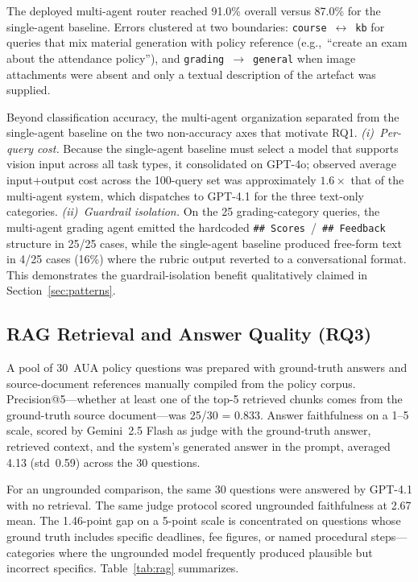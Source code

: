 \documentclass[conference]{IEEEtran}
\begin{document}
The deployed multi-agent router reached 91.0\% overall versus 87.0\% for the single-agent baseline. Errors clustered at two boundaries: \texttt{course}~$\leftrightarrow$~\texttt{kb} for queries that mix material generation with policy reference (e.g.,~``create an exam about the attendance policy''), and \texttt{grading}~$\to$~\texttt{general} when image attachments were absent and only a textual description of the artefact was supplied.

Beyond classification accuracy, the multi-agent organization separated from the single-agent baseline on the two non-accuracy axes that motivate RQ1. \emph{(i)~Per-query cost.} Because the single-agent baseline must select a model that supports vision input across all task types, it consolidated on GPT-4o; observed average input+output cost across the 100-query set was approximately $1.6\times$ that of the multi-agent system, which dispatches to GPT-4.1 for the three text-only categories. \emph{(ii)~Guardrail isolation.} On the 25 grading-category queries, the multi-agent grading agent emitted the hardcoded \texttt{\#\#~Scores}~/~\texttt{\#\#~Feedback} structure in 25/25 cases, while the single-agent baseline produced free-form text in 4/25 cases (16\%) where the rubric output reverted to a conversational format. This demonstrates the guardrail-isolation benefit qualitatively claimed in Section~\ref{sec:patterns}.

\subsection{RAG Retrieval and Answer Quality (RQ3)}

A pool of 30~AUA policy questions was prepared with ground-truth answers and source-document references manually compiled from the policy corpus. Precision@5---whether at least one of the top-5 retrieved chunks comes from the ground-truth source document---was 25/30 = 0.833. Answer faithfulness on a 1--5 scale, scored by Gemini~2.5 Flash as judge with the ground-truth answer, retrieved context, and the system's generated answer in the prompt, averaged 4.13 (std~0.59) across the 30 questions.

For an ungrounded comparison, the same 30 questions were answered by GPT-4.1 with no retrieval. The same judge protocol scored ungrounded faithfulness at 2.67 mean. The 1.46-point gap on a 5-point scale is concentrated on questions whose ground truth includes specific deadlines, fee figures, or named procedural steps---categories where the ungrounded model frequently produced plausible but incorrect specifics. Table~\ref{tab:rag} summarizes.
\end{document}

